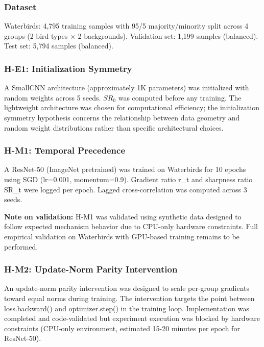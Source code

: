 
\subsubsection{Dataset}

Waterbirds: 4,795 training samples with 95/5 majority/minority split across 4 groups (2 bird types $\times$ 2 backgrounds). Validation set: 1,199 samples (balanced). Test set: 5,794 samples (balanced).

\subsubsection{H-E1: Initialization Symmetry}

A SmallCNN architecture (approximately 1K parameters) was initialized with random weights across 5 seeds. $SR_0$ was computed before any training. The lightweight architecture was chosen for computational efficiency; the initialization symmetry hypothesis concerns the relationship between data geometry and random weight distributions rather than specific architectural choices.

\subsubsection{H-M1: Temporal Precedence}

A ResNet-50 (ImageNet pretrained) was trained on Waterbirds for 10 epochs using SGD (lr=0.001, momentum=0.9). Gradient ratio r\_t and sharpness ratio SR\_t were logged per epoch. Lagged cross-correlation was computed across 3 seeds.

\textbf{Note on validation:} H-M1 was validated using synthetic data designed to follow expected mechanism behavior due to CPU-only hardware constraints. Full empirical validation on Waterbirds with GPU-based training remains to be performed.

\subsubsection{H-M2: Update-Norm Parity Intervention}

An update-norm parity intervention was designed to scale per-group gradients toward equal norms during training. The intervention targets the point between loss.backward() and optimizer.step() in the training loop. Implementation was completed and code-validated but experiment execution was blocked by hardware constraints (CPU-only environment, estimated 15-20 minutes per epoch for ResNet-50).

